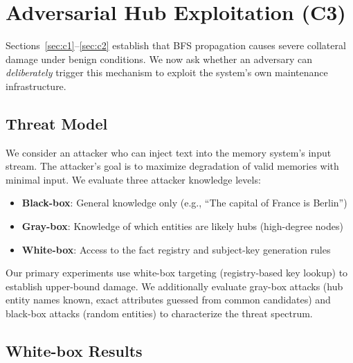 \documentclass[11pt]{article}
\begin{document}
\section{Adversarial Hub Exploitation (C3)}
\label{sec:c3}

Sections~\ref{sec:c1}--\ref{sec:c2} establish that BFS propagation causes severe collateral damage under benign conditions.
We now ask whether an adversary can \textit{deliberately} trigger this mechanism to exploit the system's own maintenance infrastructure.

\subsection{Threat Model}

We consider an attacker who can inject text into the memory system's input stream.
The attacker's goal is to maximize degradation of valid memories with minimal input.
We evaluate three attacker knowledge levels:

\begin{itemize}
  \item \textbf{Black-box}: General knowledge only (e.g., ``The capital of France is Berlin'')
  \item \textbf{Gray-box}: Knowledge of which entities are likely hubs (high-degree nodes)
  \item \textbf{White-box}: Access to the fact registry and subject-key generation rules
\end{itemize}

Our primary experiments use white-box targeting (registry-based key lookup) to establish upper-bound damage. We additionally evaluate gray-box attacks (hub entity names known, exact attributes guessed from common candidates) and black-box attacks (random entities) to characterize the threat spectrum.

\subsection{White-box Results}
\end{document}
